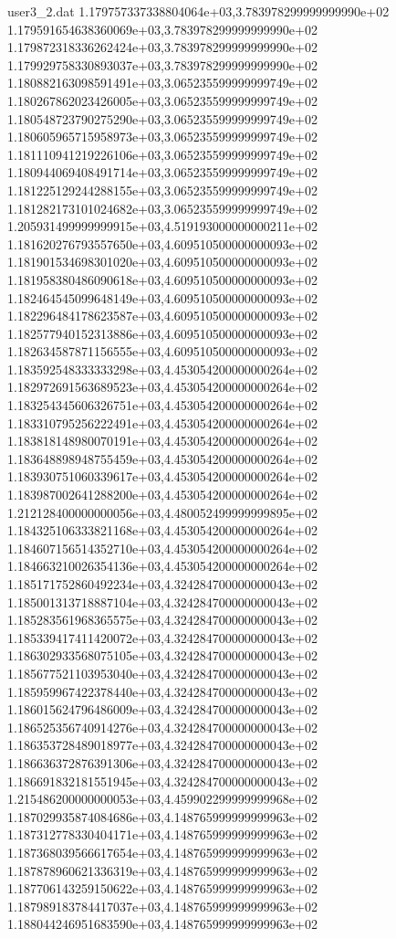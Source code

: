 \begin{filecontents}{user3_2.dat}
1.179757337338804064e+03,3.783978299999999990e+02
1.179591654638360069e+03,3.783978299999999990e+02
1.179872318336262424e+03,3.783978299999999990e+02
1.179929758330893037e+03,3.783978299999999990e+02
1.180882163098591491e+03,3.065235599999999749e+02
1.180267862023426005e+03,3.065235599999999749e+02
1.180548723790275290e+03,3.065235599999999749e+02
1.180605965715958973e+03,3.065235599999999749e+02
1.181110941219226106e+03,3.065235599999999749e+02
1.180944069408491714e+03,3.065235599999999749e+02
1.181225129244288155e+03,3.065235599999999749e+02
1.181282173101024682e+03,3.065235599999999749e+02
1.205931499999999915e+03,4.519193000000000211e+02
1.181620276793557650e+03,4.609510500000000093e+02
1.181901534698301020e+03,4.609510500000000093e+02
1.181958380486090618e+03,4.609510500000000093e+02
1.182464545099648149e+03,4.609510500000000093e+02
1.182296484178623587e+03,4.609510500000000093e+02
1.182577940152313886e+03,4.609510500000000093e+02
1.182634587871156555e+03,4.609510500000000093e+02
1.183592548333333298e+03,4.453054200000000264e+02
1.182972691563689523e+03,4.453054200000000264e+02
1.183254345606326751e+03,4.453054200000000264e+02
1.183310795256222491e+03,4.453054200000000264e+02
1.183818148980070191e+03,4.453054200000000264e+02
1.183648898948755459e+03,4.453054200000000264e+02
1.183930751060339617e+03,4.453054200000000264e+02
1.183987002641288200e+03,4.453054200000000264e+02
1.212128400000000056e+03,4.480052499999999895e+02
1.184325106333821168e+03,4.453054200000000264e+02
1.184607156514352710e+03,4.453054200000000264e+02
1.184663210026354136e+03,4.453054200000000264e+02
1.185171752860492234e+03,4.324284700000000043e+02
1.185001313718887104e+03,4.324284700000000043e+02
1.185283561968365575e+03,4.324284700000000043e+02
1.185339417411420072e+03,4.324284700000000043e+02
1.186302933568075105e+03,4.324284700000000043e+02
1.185677521103953040e+03,4.324284700000000043e+02
1.185959967422378440e+03,4.324284700000000043e+02
1.186015624796486009e+03,4.324284700000000043e+02
1.186525356740914276e+03,4.324284700000000043e+02
1.186353728489018977e+03,4.324284700000000043e+02
1.186636372876391306e+03,4.324284700000000043e+02
1.186691832181551945e+03,4.324284700000000043e+02
1.215486200000000053e+03,4.459902299999999968e+02
1.187029935874084686e+03,4.148765999999999963e+02
1.187312778330404171e+03,4.148765999999999963e+02
1.187368039566617654e+03,4.148765999999999963e+02
1.187878960621336319e+03,4.148765999999999963e+02
1.187706143259150622e+03,4.148765999999999963e+02
1.187989183784417037e+03,4.148765999999999963e+02
1.188044246951683590e+03,4.148765999999999963e+02

\end{filecontents}
